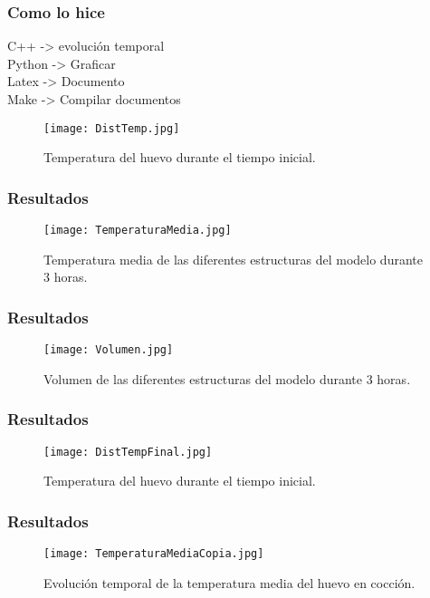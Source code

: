 \documentclass[11pt]{beamer}
\begin{document}
	\begin{frame}
		\frametitle{Como lo hice}
		C++ -> evolución temporal\\
		Python -> Graficar\\
		Latex -> Documento\\
		Make -> Compilar documentos\\
	
				\begin{figure}
			\centering
			\texttt{[image: DistTemp.jpg]}
			\caption{Temperatura del huevo durante el tiempo inicial.}
		\end{figure}
		
		
		

		
		
	\end{frame}

	\begin{frame}
		\frametitle{Resultados}
			\begin{figure}
			\centering
			\texttt{[image: TemperaturaMedia.jpg]}
			\caption{Temperatura media de las diferentes estructuras del modelo durante 3 horas.}
		\end{figure}
	\end{frame}

	\begin{frame}
		\frametitle{Resultados}
		\begin{figure}
			\centering
			\texttt{[image: Volumen.jpg]}
			\caption{Volumen de las diferentes estructuras del modelo durante 3 horas.}
		\end{figure}
	\end{frame}


	\begin{frame}
	\frametitle{Resultados}
		\begin{figure}
		\centering
		\texttt{[image: DistTempFinal.jpg]}
		\caption{Temperatura del huevo durante el tiempo inicial.}
	\end{figure}
\end{frame}

\begin{frame}
	\frametitle{Resultados}
		\begin{figure}[h]
		\centering
		\texttt{[image: TemperaturaMediaCopia.jpg]}
		\caption{Evolución temporal de la temperatura media del huevo en cocción.}
	\end{figure}
\end{frame}
\end{document}
